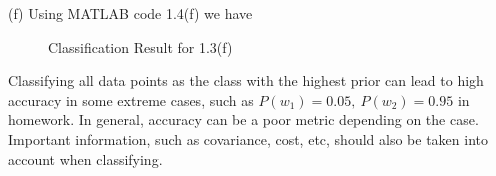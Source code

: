 \documentclass[12pt]{article}
\begin{document}
\noindent(f) Using MATLAB code 1.4(f) we have
\begin{figure}[H]
\centering
{}%
%

\caption{Classification Result for 1.3(f)}
\end{figure}

\noindent Classifying all data points as the class with the highest prior can lead to high accuracy in some extreme cases, such as $P(w_1)=0.05,\ P(w_2)=0.95$ in homework. In general, accuracy can be a poor metric depending on the case. Important information, such as covariance, cost, etc, should also be taken into account when classifying.
\end{document}
